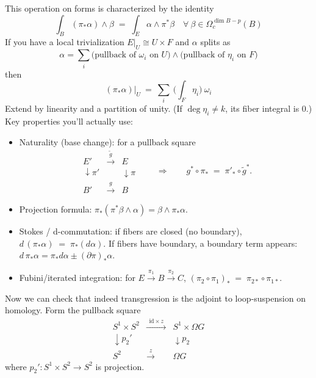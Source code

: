 \documentclass[12pt]{article}
\begin{document}
\begin{remark}
    This operation on forms is characterized by the identity
    \[
        \int_{B}\!(\pi_* \alpha)\wedge \beta\;=\;\int_{E}\!\alpha\wedge \pi^*\beta\quad
        \forall\ \beta\in\Omega_c^{\dim B - p}(B)
    \]
If you have a local trivialization $E|_U\cong U\times F$ and $\alpha$ splits as
    \[\alpha = \sum_i \text{(pullback of $\omega_i$ on $U$)} \wedge \text{(pullback of $\eta_i$ on $F$)}\] then
    \[
        (\pi_* \alpha)|_{U}\ =\ \sum_i\ \Big(\int_{F}\eta_i\Big)\ \omega_i
    \]
    Extend by linearity and a partition of unity. (If $\deg \eta_i\neq k$, its fiber integral is 0.)
    Key properties you'll actually use:
    \begin{itemize}
        \item Naturality (base change): for a pullback square
              \[
                  \begin{array}{ccc}
                      E'              & \xrightarrow{\ \tilde g\ } & E              \\
                      \downarrow \pi' &                            & \downarrow \pi \\
                      B'              & \xrightarrow{\ g\ }        & B
                  \end{array}
                  \qquad\Rightarrow\qquad
                  g^* \circ \pi_* \;=\; \pi'_* \circ \tilde g^*.
              \]
        \item Projection formula: $\pi_*(\pi^*\beta\wedge \alpha)=\beta\wedge \pi_*\alpha$.
        \item Stokes / d-commutation: if fibers are closed (no boundary),
              $d\,(\pi_* \alpha)\;=\;\pi_*(d\alpha)$.
              If fibers have boundary, a boundary term appears: $d\,\pi_* \alpha = \pi_* d\alpha \pm (\partial\pi)_*\alpha$.
        \item Fubini/iterated integration: for $E\xrightarrow{\pi_1} B\xrightarrow{\pi_2} C$,
              $(\pi_2\circ \pi_1)_* \;=\; \pi_{2*}\circ \pi_{1*}$.
    \end{itemize}
    Now we can check that indeed transgression is the adjoint to loop-suspension on homology.
    Form the pullback square
    \[
    \begin{array}{ccc}
    S^1\times S^2 & \xrightarrow{\ \ \mathrm{id}\times z\ \ } & S^1\times\Omega G\\[4pt]
    \downarrow p_2' & & \downarrow p_2\\[4pt]
    S^2 & \xrightarrow{\ \ z\ \ } & \Omega G
    \end{array}
    \]
    where $p_2':S^1\times S^2\to S^2$ is projection.


\end{remark}
\end{document}

